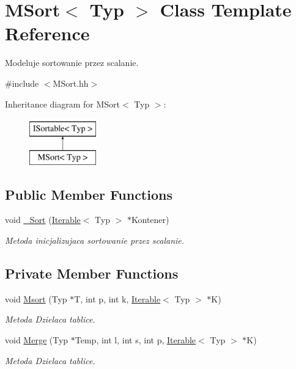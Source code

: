 \hypertarget{class_m_sort}{\section{M\-Sort$<$ Typ $>$ Class Template Reference}
\label{class_m_sort}
}


Modeluje sortowanie przez scalanie.  




{\ttfamily \#include $<$M\-Sort.\-hh$>$}

Inheritance diagram for M\-Sort$<$ Typ $>$\-:\begin{figure}[H]
\begin{center}
\leavevmode
\includegraphics[height=2.000000cm]{class_m_sort}
\end{center}
\end{figure}
\subsection*{Public Member Functions}
\begin{DoxyCompactItemize}
\item 
void \hyperlink{class_m_sort_a90bfe37f7a17b529b97abba47495ab9a}{\-\_\-\-Sort} (\hyperlink{class_iterable}{Iterable}$<$ Typ $>$ $\ast$Kontener)
\begin{DoxyCompactList}\small\item\em Metoda inicjalizujaca sortowanie przez scalanie. \end{DoxyCompactList}\end{DoxyCompactItemize}
\subsection*{Private Member Functions}
\begin{DoxyCompactItemize}
\item 
void \hyperlink{class_m_sort_a2bc5e52492763e452c81d252a2e16a46}{Msort} (Typ $\ast$T, int p, int k, \hyperlink{class_iterable}{Iterable}$<$ Typ $>$ $\ast$K)
\begin{DoxyCompactList}\small\item\em Metoda Dzielaca tablice. \end{DoxyCompactList}\item 
void \hyperlink{class_m_sort_a04a2f5f2f3afc5337fe07e9f387dc291}{Merge} (Typ $\ast$Temp, int l, int s, int p, \hyperlink{class_iterable}{Iterable}$<$ Typ $>$ $\ast$K)
\begin{DoxyCompactList}\small\item\em Metoda Dzielaca tablice. \end{DoxyCompactList}\end{DoxyCompactItemize}


